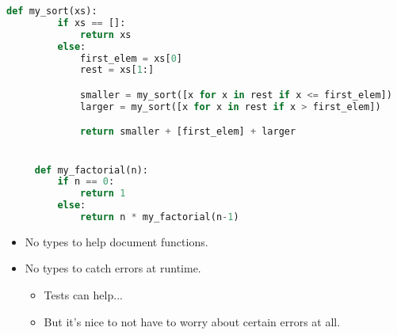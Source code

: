 \documentclass{beamer}
\begin{document}
\begin{frame}[fragile]
  \begin{lstlisting}[frame=single, language=Python, breaklines=true, basicstyle=\ttfamily\tiny]
     def my_sort(xs):
         if xs == []:
             return xs
         else:
             first_elem = xs[0]
             rest = xs[1:]

             smaller = my_sort([x for x in rest if x <= first_elem])
             larger = my_sort([x for x in rest if x > first_elem])

             return smaller + [first_elem] + larger


     def my_factorial(n):
         if n == 0:
             return 1
         else:
             return n * my_factorial(n-1)
  \end{lstlisting}

  \begin{itemize}
  \item No types to help document functions.
  \item No types to catch errors at runtime.
    \begin{itemize}
    \item Tests can help...
    \item But it's nice to not have to worry about certain errors at all.
    \end{itemize}
  \end{itemize}
\end{frame}
\end{document}
